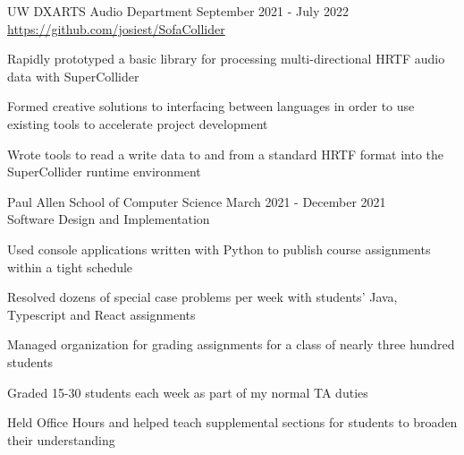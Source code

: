 \documentclass[10pt]{article}
\newenvironment{itemize*}
{\begin{itemize}[leftmargin=*]
    \setlength{\parskip}{0.5pt}}
{\end{itemize}}
\begin{document}
\begin{description}[leftmargin=!,
                    labelwidth=\widthof{\bfseries SuperCollider Audio
                                                  Programming Study}]
\item[SuperCollider Audio Programming Study]
    UW DXARTS Audio Department  \hfill September 2021 - July 2022\\
    \url{https://github.com/josiest/SofaCollider}
    
\end{description}
\begin{itemize*}
\item Rapidly prototyped a basic library for processing multi-directional HRTF audio data with SuperCollider
\item Formed creative solutions to interfacing between languages in order to
    use existing tools to accelerate project development
\item Wrote tools to read a write data to and from a standard HRTF format into
    the SuperCollider runtime environment
\end{itemize*}
\vspace{10pt}

\begin{description}[leftmargin=!,
                    labelwidth=\widthof{\bfseries Teaching Assistant}]

\item[Teaching Assistant] Paul Allen School of Computer Science \hfill 
    March 2021 - December 2021\\
    Software Design and Implementation
\end{description}
\begin{itemize*}
\item Used console applications written with Python to publish course
      assignments within a tight schedule
\item Resolved dozens of special case problems per week with students' Java,
      Typescript and React assignments
\item Managed organization for grading assignments for a class of nearly three
      hundred students
\item Graded 15-30 students each week as part of my normal TA duties
\item Held Office Hours and helped teach supplemental sections for students to
      broaden their understanding
\end{itemize*}
\end{document}
